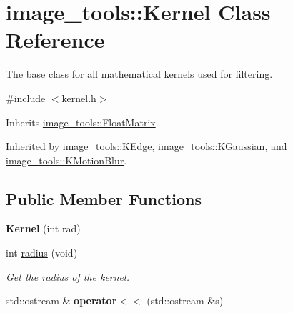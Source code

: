 \hypertarget{classimage__tools_1_1Kernel}{}\section{image\+\_\+tools\+:\+:Kernel Class Reference}
\label{classimage__tools_1_1Kernel}


The base class for all mathematical kernels used for filtering.  




{\ttfamily \#include $<$kernel.\+h$>$}



Inherits \hyperlink{classimage__tools_1_1FloatMatrix}{image\+\_\+tools\+::\+Float\+Matrix}.



Inherited by \hyperlink{classimage__tools_1_1KEdge}{image\+\_\+tools\+::\+K\+Edge}, \hyperlink{classimage__tools_1_1KGaussian}{image\+\_\+tools\+::\+K\+Gaussian}, and \hyperlink{classimage__tools_1_1KMotionBlur}{image\+\_\+tools\+::\+K\+Motion\+Blur}.

\subsection*{Public Member Functions}
\begin{DoxyCompactItemize}
\item 
{\bfseries Kernel} (int rad)\hypertarget{classimage__tools_1_1Kernel_ac25b0cb8f8e9398d7d628f3bda16b5c9}{}\label{classimage__tools_1_1Kernel_ac25b0cb8f8e9398d7d628f3bda16b5c9}

\item 
int \hyperlink{classimage__tools_1_1Kernel_ac834d16a242dd4a15f5f5e4a6dacea01}{radius} (void)\hypertarget{classimage__tools_1_1Kernel_ac834d16a242dd4a15f5f5e4a6dacea01}{}\label{classimage__tools_1_1Kernel_ac834d16a242dd4a15f5f5e4a6dacea01}

\begin{DoxyCompactList}\small\item\em Get the radius of the kernel. \end{DoxyCompactList}\item 
std\+::ostream \& {\bfseries operator$<$$<$} (std\+::ostream \&s)\hypertarget{classimage__tools_1_1Kernel_a46730d0d219b8a1abbbbb849b58a55a9}{}\label{classimage__tools_1_1Kernel_a46730d0d219b8a1abbbbb849b58a55a9}

\end{DoxyCompactItemize}
